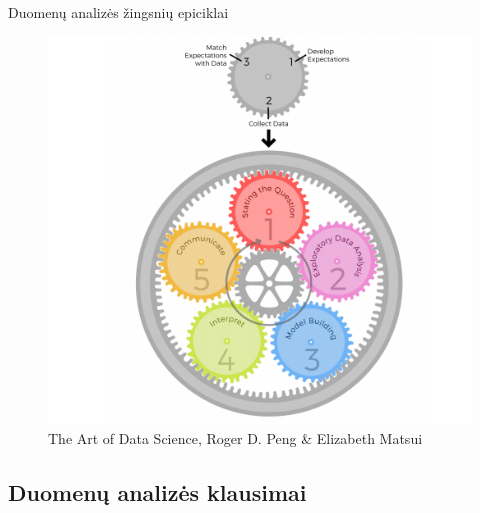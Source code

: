 \documentclass[11pt,xcolor=table]{beamer}
\begin{document}
\begin{frame}{Duomenų analizės žingsnių epiciklai}
\begin{figure}
\caption{The Art of Data Science, Roger D. Peng \& Elizabeth Matsui}
\includegraphics[scale=0.5]{Epicycles-of-Analysis.png}
\end{figure}

\end{frame}


\subsection{Duomenų analizės klausimai}
\end{document}
